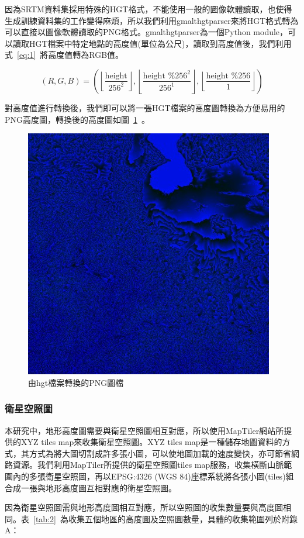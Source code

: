 \documentclass[a4paper, 12pt]{article}
\begin{document}
因為SRTM資料集採用特殊的HGT格式，不能使用一般的圖像軟體讀取，也使得生成訓練資料集的工作變得麻煩，所以我們利用gmalthgtparser來將HGT格式轉為可以直接以圖像軟體讀取的PNG格式。gmalthgtparser為一個Python module，可以讀取HGT檔案中特定地點的高度值(單位為公尺)，讀取到高度值後，我們利用式~\ref{eq:1}~將高度值轉為RGB值。

\begin{equation}
    (R, G, B)=\left(\left\lfloor\frac{\text {height}}{256^{2}}\right\rfloor,\left\lfloor\frac{\text {height } \% 256^{2}}{256^{1}}\right\rfloor,\left\lfloor\frac{\text {height } \% 256}{1}\right\rfloor\right)
    \label{eq:1}
\end{equation}

對高度值進行轉換後，我們即可以將一張HGT檔案的高度圖轉換為方便易用的PNG高度圖，轉換後的高度圖如圖~\ref{fig:7}~。

\begin{figure}[htbp]
    \centering
    \includegraphics[width=0.45\linewidth]{fig/7.jpg}
    \caption{由hgt檔案轉換的PNG圖檔}
    \label{fig:7}
\end{figure}

\subsubsection{衛星空照圖}
本研究中，地形高度圖需要與衛星空照圖相互對應，所以使用MapTiler網站所提供的XYZ tiles map來收集衛星空照圖。XYZ tiles map是一種儲存地圖資料的方式，其方式為將大圖切割成許多張小圖，可以使地圖加載的速度變快，亦可節省網路資源。我們利用MapTiler所提供的衛星空照圖tiles map服務，收集橫斷山脈範圍內的多張衛星空照圖，再以EPSG:4326 (WGS 84)座標系統將各張小圖(tiles)組合成一張與地形高度圖互相對應的衛星空照圖。

因為衛星空照圖需與地形高度圖相互對應，所以空照圖的收集數量要與高度圖相同。表~\ref{tab:2}~為收集五個地區的高度圖及空照圖數量，具體的收集範圍列於附錄A：
\end{document}
